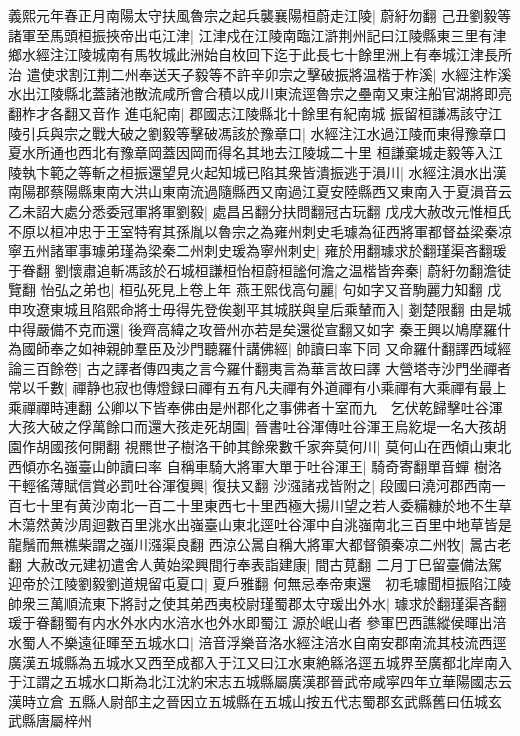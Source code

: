 義熙元年春正月南陽太守扶風魯宗之起兵襲襄陽桓蔚走江陵|{
	蔚紆勿翻}
己丑劉毅等諸軍至馬頭桓振挾帝出屯江津|{
	江津戍在江陵南臨江滸荆州記曰江陵縣東三里有津鄉水經注江陵城南有馬牧城此洲始自枚回下迄于此長七十餘里洲上有奉城江津長所治}
遣使求割江荆二州奉送天子毅等不許辛卯宗之擊破振將温楷于柞溪|{
	水經注柞溪水出江陵縣北蓋諸池散流咸所會合積以成川東流逕魯宗之壘南又東注船官湖將即亮翻柞才各翻又音作}
進屯紀南|{
	郡國志江陵縣北十餘里有紀南城}
振留桓謙馮該守江陵引兵與宗之戰大破之劉毅等擊破馮該於豫章口|{
	水經注江水過江陵而東得豫章口夏水所通也西北有豫章岡蓋因岡而得名其地去江陵城二十里}
桓謙棄城走毅等入江陵執卞範之等斬之桓振還望見火起知城已陷其衆皆潰振逃于溳川|{
	水經注溳水出漢南陽郡蔡陽縣東南大洪山東南流過隨縣西又南過江夏安陸縣西又東南入于夏溳音云}
乙未詔大處分悉委冠軍將軍劉毅|{
	處昌呂翻分扶問翻冠古玩翻}
戊戌大赦改元惟桓氏不原以桓冲忠于王室特宥其孫胤以魯宗之為雍州刺史毛璩為征西將軍都督益梁秦凉寧五州諸軍事璩弟瑾為梁秦二州刺史瑗為寧州刺史|{
	雍於用翻璩求於翻瑾渠吝翻瑗于眷翻}
劉懷肅追斬馮該於石城桓謙桓怡桓蔚桓謐何澹之温楷皆奔秦|{
	蔚紆勿翻澹徒覽翻}
怡弘之弟也|{
	桓弘死見上卷上年}
燕王熙伐高句麗|{
	句如字又音駒麗力知翻}
戊申攻遼東城且陷熙命將士毋得先登俟剗平其城朕與皇后乘輦而入|{
	剗楚限翻}
由是城中得嚴備不克而還|{
	後齊高緯之攻晉州亦若是矣還從宣翻又如字}
秦王興以鳩摩羅什為國師奉之如神親帥羣臣及沙門聽羅什講佛經|{
	帥讀曰率下同}
又命羅什翻譯西域經論三百餘卷|{
	古之譯者傳四夷之言今羅什翻夷言為華言故曰譯}
大營塔寺沙門坐禪者常以千數|{
	禪静也寂也傳燈録曰禪有五有凡夫禪有外道禪有小乘禪有大乘禪有最上乘禪禪時連翻}
公卿以下皆奉佛由是州郡化之事佛者十室而九　乞伏乾歸擊吐谷渾大孩大破之俘萬餘口而還大孩走死胡園|{
	晉書吐谷渾傳吐谷渾王烏紇堤一名大孩胡園作胡國孩何開翻}
視羆世子樹洛干帥其餘衆數千家奔莫何川|{
	莫何山在西傾山東北西傾亦名嵹臺山帥讀曰率}
自稱車騎大將軍大單于吐谷渾王|{
	騎奇寄翻單音蟬}
樹洛干輕徭薄賦信賞必罰吐谷渾復興|{
	復扶又翻}
沙漒諸戎皆附之|{
	段國曰澆河郡西南一百七十里有黄沙南北一百二十里東西七十里西極大揚川望之若人委糒糠於地不生草木蕩然黄沙周迴數百里洮水出嵹臺山東北逕吐谷渾中自洮嵹南北三百里中地草皆是龍鬚而無樵柴謂之嵹川漒渠良翻}
西涼公暠自稱大將軍大都督領秦凉二州牧|{
	暠古老翻}
大赦改元建初遣舍人黄始梁興間行奉表詣建康|{
	間古莧翻}
二月丁巳留臺備法駕迎帝於江陵劉毅劉道規留屯夏口|{
	夏戶雅翻}
何無忌奉帝東還　初毛璩聞桓振陷江陵帥衆三萬順流東下將討之使其弟西夷校尉瑾蜀郡太守瑗出外水|{
	璩求於翻瑾渠吝翻瑗于眷翻蜀有内水外水内水涪水也外水即蜀江源於岷山者}
參軍巴西譙縱侯暉出涪水蜀人不樂遠征暉至五城水口|{
	涪音浮樂音洛水經注涪水自南安郡南流其枝流西逕廣漢五城縣為五城水又西至成都入于江又曰江水東絶緜洛逕五城界至廣都北岸南入于江謂之五城水口斯為北江沈約宋志五城縣屬廣漢郡晉武帝咸寜四年立華陽國志云漢時立倉五縣人尉部主之晉因立五城縣在五城山按五代志蜀郡玄武縣舊曰伍城玄武縣唐屬梓州}
